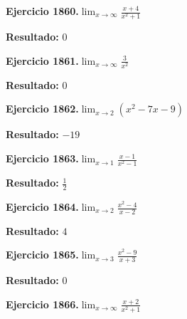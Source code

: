 \documentclass[10pt,a4paper]{article}
\begin{document}
\begin{ejbox}
\textbf{Ejercicio 1860.}\quad $\lim_{x\to \infty} \frac{x + 4}{x^2 + 1}$
\end{ejbox}

\begin{solbox}
\textbf{Resultado:} \(\displaystyle 0\)
\end{solbox}

\newpage
\begin{ejbox}
\textbf{Ejercicio 1861.}\quad $\lim_{x\to \infty} \frac{3}{x^2}$
\end{ejbox}

\begin{solbox}
\textbf{Resultado:} \(\displaystyle 0\)
\end{solbox}

\begin{ejbox}
\textbf{Ejercicio 1862.}\quad $\lim_{x\to 2} (x^2 -7x -9)$
\end{ejbox}

\begin{solbox}
\textbf{Resultado:} \(\displaystyle -19\)
\end{solbox}

\begin{ejbox}
\textbf{Ejercicio 1863.}\quad $\lim_{x\to 1} \frac{x-1}{x^2-1}$
\end{ejbox}

\begin{solbox}
\textbf{Resultado:} \(\displaystyle \frac{1}{2}\)
\end{solbox}

\newpage
\begin{ejbox}
\textbf{Ejercicio 1864.}\quad $\lim_{x\to 2} \frac{x^2-4}{x-2}$
\end{ejbox}

\begin{solbox}
\textbf{Resultado:} \(\displaystyle 4\)
\end{solbox}

\begin{ejbox}
\textbf{Ejercicio 1865.}\quad $\lim_{x\to 3} \frac{x^2-9}{x+3}$
\end{ejbox}

\begin{solbox}
\textbf{Resultado:} \(\displaystyle 0\)
\end{solbox}

\begin{ejbox}
\textbf{Ejercicio 1866.}\quad $\lim_{x\to \infty} \frac{x + 2}{x^2 + 1}$
\end{ejbox}
\end{document}
